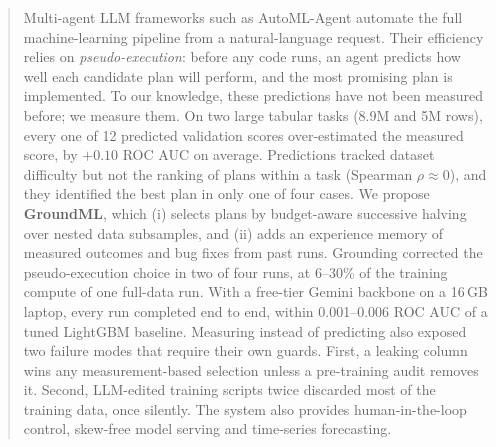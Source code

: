 \begin{abstract}
Multi-agent LLM frameworks such as AutoML-Agent automate the full machine-learning pipeline from a natural-language request. Their efficiency relies on \emph{pseudo-execution}: before any code runs, an agent predicts how well each candidate plan will perform, and the most promising plan is implemented. To our knowledge, these predictions have not been measured before; we measure them. On two large tabular tasks (8.9M and 5M rows), every one of 12 predicted validation scores over-estimated the measured score, by $+0.10$ ROC AUC on average. Predictions tracked dataset difficulty but not the ranking of plans within a task (Spearman $\rho \approx 0$), and they identified the best plan in only one of four cases. We propose \textbf{GroundML}, which (i) selects plans by budget-aware successive halving over nested data subsamples, and (ii) adds an experience memory of measured outcomes and bug fixes from past runs. Grounding corrected the pseudo-execution choice in two of four runs, at 6--30\% of the training compute of one full-data run. With a free-tier Gemini backbone on a 16\,GB laptop, every run completed end to end, within 0.001--0.006 ROC AUC of a tuned LightGBM baseline. Measuring instead of predicting also exposed two failure modes that require their own guards. First, a leaking column wins any measurement-based selection unless a pre-training audit removes it. Second, LLM-edited training scripts twice discarded most of the training data, once silently. The system also provides human-in-the-loop control, skew-free model serving and time-series forecasting.
\end{abstract}
